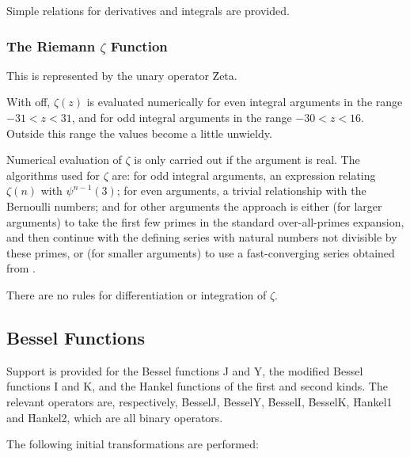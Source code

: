 Simple relations for derivatives and integrals are provided.


\subsubsection{The Riemann $\zeta$ Function}

This is represented by the unary operator \f{Zeta}.

With  off, $\zeta(z)$ is evaluated numerically for even
integral arguments in the range $-31 < z < 31$, and for odd integral
arguments in the range $-30 < z < 16$.  Outside this range the values
become a little unwieldy.

Numerical evaluation of $\zeta$ is only carried out if the argument is real.
The algorithms used for $\zeta$ are: for odd integral arguments, an
expression relating $\zeta(n)$ with $\psi^{n-1}(3)$; for even arguments, a
trivial relationship with the Bernoulli numbers; and for other arguments the
approach is either (for larger arguments) to take the first few primes in
the standard over-all-primes expansion, and then continue with the defining
series with natural numbers not divisible by these primes, or (for smaller
arguments) to use a fast-converging series obtained from \cite{Bender:78}.

There are no rules for differentiation or integration of $\zeta$.


\subsection{Bessel Functions}

Support is provided for the Bessel functions J and Y, the modified
Bessel functions I and K, and the Hankel functions of the first and
second kinds.  The relevant operators are, respectively, \f{BesselJ},
\f{BesselY}, \f{BesselI}, \f{BesselK}, \f{Hankel1} and \f{Hankel2}, 
which are all binary operators.

The following initial transformations are performed:


